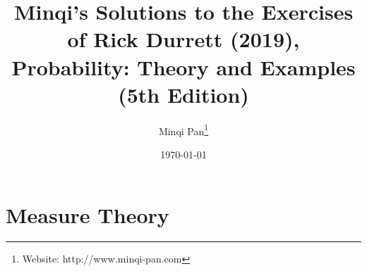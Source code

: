 \documentclass{amsbook}
\theoremstyle{definition}
\theoremstyle{remark}
\numberwithin{section}{chapter}
\numberwithin{equation}{chapter}
\begin{document}
\frontmatter

\title{Minqi's Solutions to the Exercises of Rick Durrett (2019), Probability: Theory and Examples (5th Edition)}

\author{Minqi Pan\footnote{Website: http://www.minqi-pan.com}}

\date{\today}

\maketitle

\setcounter{page}{4}

\tableofcontents

\mainmatter

\chapter{Measure Theory}
\end{document}
